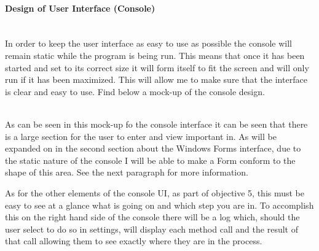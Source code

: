 \begin{FlushLeft}
    \paragraph{Design of User Interface (Console)} \mbox{} \\
    In order to keep the user interface as easy to use as possible the console will remain static while the program is being run. This means that once it has been started and set to its correct size it will form itself to fit the screen and will only run if it has been maximized. This will allow me to make sure that the interface is clear and easy to use. Find below a mock-up of the console design.
    
    \begin{figure}[H]
        \centering
    \end{figure}\\

    As can be seen in this mock-up fo the console interface it can be seen that there is a large section for the user to enter and view important in. As will be expanded on in the second section about the Windows Forms interface, due to the static nature of the console I will be able to make a Form conform to the shape of this area. See the next paragraph for more information. \\ \bk

    As for the other elements of the console UI, as part of objective 5, this must be easy to see at a glance what is going on and which step you are in. To accomplish this on the right hand side of the console there will be a log which, should the user select to do so in settings, will display each method call and the result of that call allowing them to see exactly where they are in the process. \\ \bk
    

\end{FlushLeft}
